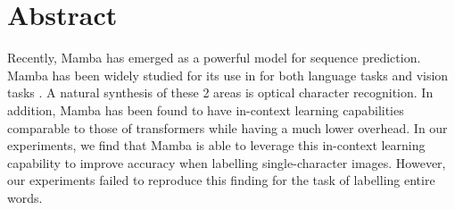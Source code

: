 \section{Abstract}
Recently, Mamba has emerged as a powerful model for sequence prediction.
Mamba has been widely studied for its use in for both language tasks\cite{mamba}
\cite{mambalang} and vision tasks\cite{medmamba} \cite{vmamba}.
A natural synthesis of these 2 areas is optical character recognition.
In addition, Mamba has been found to have in-context learning capabilities
comparable to those of transformers while having a much lower
overhead\cite{mambaicl}.
In our experiments, we find that Mamba is able to leverage this in-context
learning capability to improve accuracy when labelling single-character images.
However, our experiments failed to reproduce this finding for the task of
labelling entire words.
